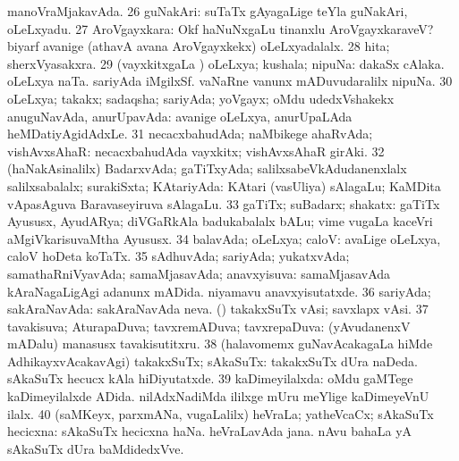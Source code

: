 {{manoVraMjakavAda. 
\num{26} guNakAri:  suTaTx
gAyagaLige teYla guNakAri, oLeLxyadu. 
\num{27} AroVgayxkara:  Okf haNuNxgaLu tinanxlu AroVgayxkaraveV?
 biyarf avanige
(athavA avana AroVgayxkekx) oLeLxyadalalx. 
\num{28} hita; sherxVyasakxra.
\num{29} (vayxkitxgaLa \vi) oLeLxya; kushala; nipuNa: 
dakaSx cAlaka.  oLeLxya naTa. 
sariyAda iMgilxSf.  vaNaRne \mo vanunx mADuvudaralilx
nipuNa. 
\num{30} oLeLxya; takakx; sadaqsha; sariyAda; yoVgayx; oMdu
udedxVshakekx anuguNavAda, anurUpavAda: 
avanige oLeLxya, anurUpaLAda heMDatiyAgidAdxLe. 
\num{31} necacxbahudAda;
naMbikege ahaRvAda; vishAvxsAhaR:  necacxbahudAda vayxkitx; vishAvxsAhaR girAki. 
\num{32} (haNakAsinalilx) BadarxvAda; gaTiTxyAda;
salilxsabeVkAdudanenxlalx salilxsabalalx; surakiSxta; KAtariyAda:  KAtari (vasUliya) sAlagaLu; KaMDita vApasAguva Baravaseyiruva sAlagaLu.
\num{33} gaTiTx; suBadarx; shakatx:  gaTiTx Ayususx, AyudARya;
diVGaRkAla badukabalalx bALu; vime \mo vugaLa kaceVri aMgiVkarisuvaMtha Ayususx. 
\num{34} balavAda; oLeLxya; caloV:  avaLige
oLeLxya, caloV hoDeta koTaTx. 
\num{35} sAdhuvAda; sariyAda; yukatxvAda;
samathaRniVyavAda; samaMjasavAda; anavxyisuva: 
samaMjasavAda kAraNagaLigAgi adanunx mADida.  niyamavu
anavxyisutatxde. 
\num{36} sariyAda; sakAraNavAda: 
sakAraNavAda neva. (\AmA)  takakxSuTx vAsi; savxlapx
vAsi. 
\num{37} tavakisuva; AturapaDuva; tavxremADuva; tavxrepaDuva:
 (yAvudanenxV mADalu) manasusx tavakisutitxru. 
\num{38} (halavomemx guNavAcakagaLa hiMde AdhikayxvAcakavAgi) takakxSuTx; sAkaSuTx:
 takakxSuTx dUra naDeda.  sAkaSuTx hecucx kAla hiDiyutatxde. 
\num{39} kaDimeyilalxda:
 oMdu gaMTege kaDimeyilalxde ADida.  nilAdxNadiMda ililxge mUru meYlige kaDimeyeVnU ilalx. 
\num{40} (saMKeyx, parxmANa, \mo vugaLalilx) heVraLa; yatheVcaCx; 
sAkaSuTx hecicxna:  sAkaSuTx hecicxna haNa.
 heVraLavAda jana. 
nAvu bahaLa yA sAkaSuTx dUra baMdidedxVve.}}

